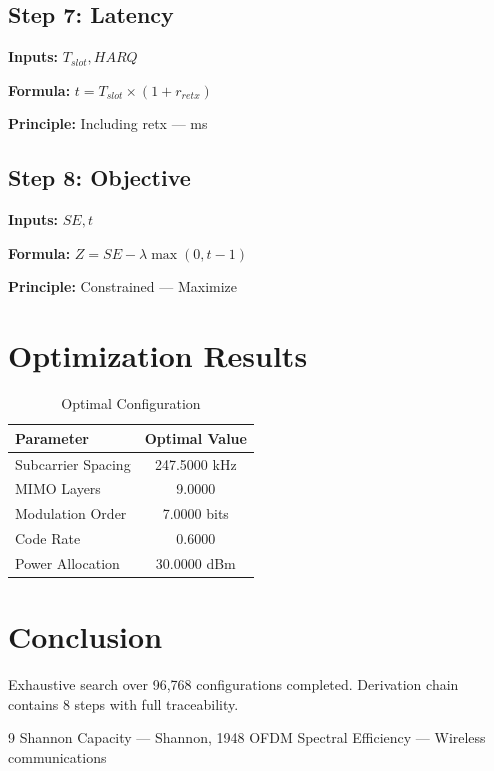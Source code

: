 \documentclass[11pt,twocolumn]{article}
\begin{document}
\subsection*{Step 7: Latency}
\textbf{Inputs:} $T_{slot}, HARQ$

\textbf{Formula:} $t = T_{slot} \times (1 + r_{retx})$

\textbf{Principle:} Including retx --- ms

\subsection*{Step 8: Objective}
\textbf{Inputs:} $SE, t$

\textbf{Formula:} $Z = SE - \lambda\max(0, t-1)$

\textbf{Principle:} Constrained --- Maximize


\section{Optimization Results}
\begin{table}[h]
\centering
\caption{Optimal Configuration}
\begin{tabular}{@{}lc@{}}
\toprule
Parameter & Optimal Value \\
\midrule
Subcarrier Spacing & 247.5000 kHz \\
MIMO Layers & 9.0000  \\
Modulation Order & 7.0000 bits \\
Code Rate & 0.6000  \\
Power Allocation & 30.0000 dBm \\
\bottomrule
\end{tabular}
\end{table}

\section{Conclusion}
Exhaustive search over 96,768 configurations completed.
Derivation chain contains 8 steps with full traceability.

\begin{thebibliography}{9}
 Shannon Capacity --- Shannon, 1948
 OFDM Spectral Efficiency --- Wireless communications
\end{thebibliography}
\end{document}

